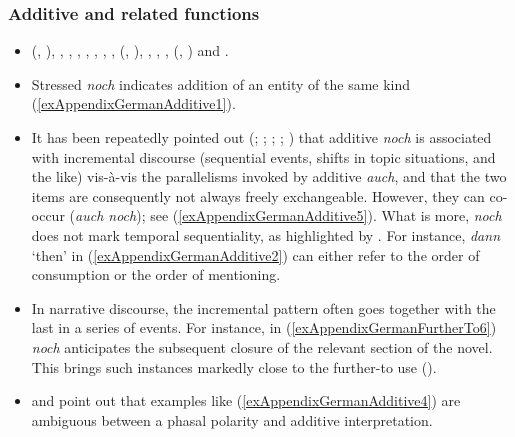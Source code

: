 \subsubsection{Additive and related functions}
\label{appendixGermanAdditive}
\begin{itemize}
	\item \citeauthor{Beck2016} (\citeyear{Beck2016}, \citeyear{Beck2020}), 	\textcite[s.v. \textit{noch}]{DWDS}, \textcite{Doherty1973}, \textcite[s.v. \textit{noch}]{Duden}, \textcite{Eckardt2006}, \textcite[186]{Helbig1994}, \textcite{HoepelmanRohrer1981}, \textcite{Klein2018}, \citeauthor{Koenig1977} (\citeyear{Koenig1977}, \citeyear[140–146]{Koenig1991}), \textcite[174–176, 177]{KoenigEtAl1993}, \textcite[626–630]{MetrichFaucher2009}, \textcite[ch. 2.2]{Nederstigt2003},
	\citeauthor{Umbach2009} (\citeyear{Umbach2009}, \citeyear{Umbach2012})  and \textcite{Shetter1966}.
			\item Stressed \textit{noch} indicates addition of an entity of the same kind (\ref{exAppendixGermanAdditive1}).
		\item It has been repeatedly pointed out (\cite{Eckardt2006}; \cite{Grubic2018}; \cite{Koenig1991}; \cite{Nederstigt2003}; \cite{Umbach2012}) that additive \textit{noch} is associated with incremental discourse (sequential events, shifts in topic situations, and the like) vis-à-vis the parallelisms invoked by additive \textit{auch}, and that the two items are consequently not always freely exchangeable. However, they can co-occur (\textit{auch noch}); see (\ref{exAppendixGermanAdditive5}). What is more, \textit{noch} does not mark temporal sequentiality, as highlighted by \textcite{Umbach2012}. For instance, \textit{dann} \lq then\rq{ } in (\ref{exAppendixGermanAdditive2}) can either refer to the order of consumption or the order of mentioning.
	\item In narrative discourse, the incremental pattern often goes together with the last in a series of events. For instance, in (\ref{exAppendixGermanFurtherTo6}) \textit{noch} anticipates the subsequent closure of the relevant section of the novel. This brings such instances markedly close to the further-to use ().
	\item \textcite{Nederstigt2003} and \textcite{Shetter1966} point out that examples like (\ref{exAppendixGermanAdditive4}) are ambiguous between a phasal polarity and additive interpretation.
\end{itemize}
\largerpage

